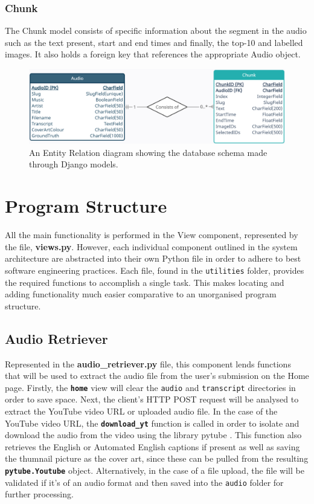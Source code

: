 \documentclass{l4proj}
\begin{document}
\subsubsection{Chunk}
The Chunk model consists of specific information about the segment in the audio such as the text present, start and end times and finally, the top-10 and labelled images. It also holds a foreign key that references the appropriate Audio object.

\begin{figure}
    \centering
    \includegraphics[width=1\textwidth]{figures/models_schema.pdf}
    \caption{An Entity Relation diagram showing the database schema made through Django models.}
    \label{fig:models_schema}
\end{figure}


\section{Program Structure}
All the main functionality is performed in the View component, represented by the file, \textbf{views.py}. However, each individual component outlined in the system architecture are abstracted into their own Python file in order to adhere to best software engineering practices. Each file, found in the \lstinline|utilities| folder, provides the required functions to accomplish a single task. This makes locating and adding functionality much easier comparative to an unorganised program structure.

\subsection{Audio Retriever}
Represented in the \textbf{audio\_retriever.py} file, this component lends functions that will be used to extract the audio file from the user's submission on the Home page. Firstly, the \textbf{\lstinline|home|} view will clear the \lstinline|audio| and \lstinline|transcript| directories in order to save space. Next, the client's HTTP POST request will be analysed to extract the YouTube video URL or uploaded audio file. In the case of the YouTube video URL, the \textbf{\lstinline|download_yt|} function is called in order to isolate and download the audio from the video using the library pytube \citep{pytube}. This function also retrieves the English or Automated English captions if present as well as saving the thumnail picture as the cover art, since these can be pulled from the resulting \textbf{\lstinline|pytube.Youtube|} object. Alternatively, in the case of a file upload, the file will be validated if it's of an audio format and then saved into the \lstinline|audio| folder for further processing.
\end{document}

